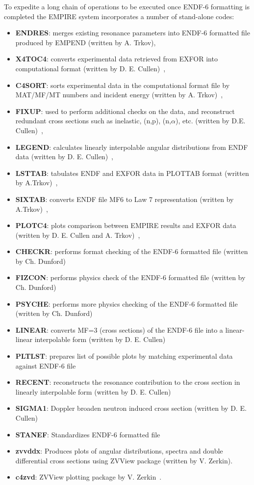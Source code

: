 To expedite a long chain of operations to be executed once ENDF-6 formatting is completed the EMPIRE system incorporates a number of stand-alone codes:
\begin{itemize}
\item \textbf{ENDRES}: merges existing resonance parameters
into ENDF-6 formatted file produced by EMPEND (written by A. Trkov),
\item \textbf{X4TOC4}: converts experimental data retrieved
from EXFOR into computational format (written by D. E. Cullen)~\cite{PREPRO},
\item \textbf{C4SORT}: sorts experimental data in the computational
format file by MAT/MF/MT numbers and incident energy (written by A. Trkov)~\cite{ENDVER},
\item \textbf{FIXUP}: used to perform additional checks on the data,
and reconstruct redundant cross sections such as inelastic, (n,p), (n,$\alpha$), etc.
(written by D.E. Cullen)~\cite{PREPRO},
\item \textbf{LEGEND}: calculates linearly interpolable
angular distributions from ENDF data (written by D. E. Cullen)~\cite{PREPRO},
\item \textbf{LSTTAB}: tabulates ENDF and EXFOR data in
PLOTTAB format (written by A.Trkov)~\cite{ENDVER},
\item \textbf{SIXTAB}: converts ENDF file MF6 to Law 7 representation
(written by A.Trkov)~\cite{ENDVER},
\item \textbf{PLOTC4}: plots comparison between EMPIRE results
and EXFOR data (written by D. E. Cullen and A. Trkov)~\cite{ENDVER},
\item \textbf{CHECKR}: performs format checking of the ENDF-6
formatted file (written by Ch. Dunford)
\item \textbf{FIZCON}: performs physics check of the ENDF-6 formatted file
(written by Ch. Dunford)
\item \textbf{PSYCHE}: performs more physics checking of the ENDF-6 formatted
file (written by Ch. Dunford)
\item \textbf{LINEAR}: converts MF=3 (cross sections) of the ENDF-6 file
into a linear-linear interpolable form (written by D. E. Cullen)~\cite{PREPRO}
\item \textbf{PLTLST}: prepares list of possible plots by matching experimental
data against ENDF-6 file
\item \textbf{RECENT}: reconstructs the resonance contribution to the cross
section in linearly interpolable form (written by D. E. Cullen)~\cite{PREPRO}
\item \textbf{SIGMA1}: Doppler broaden neutron induced cross section (written
by D. E. Cullen)~\cite{PREPRO}
\item \textbf{STANEF}: Standardizes ENDF-6 formatted file
\item \textbf{zvvddx}: Produces plots of angular distributions, spectra
and double differential cross sections using ZVView package (written
by V. Zerkin).
\item \textbf{c4zvd}: ZVView\textbf{} plotting package by
V. Zerkin~\cite{ZVView}.
\end{itemize}

